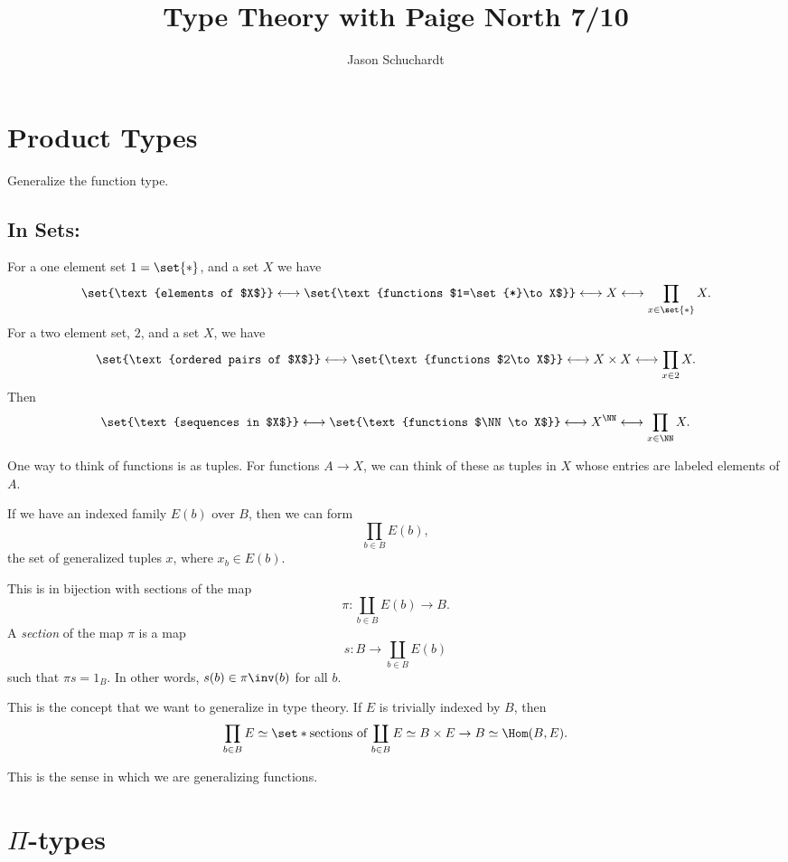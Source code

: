 \documentclass{article}
\title{Type Theory with Paige North 7/10}
\author{Jason Schuchardt}
\begin{document}
\maketitle

\section{Product Types}

Generalize the function type.

\subsection{In Sets:}

For a one element set $1=\set{*}$, and a set $X$
we have 
\[\set{\text{elements of $X$}}
\longleftrightarrow 
\set{\text{functions $1=\set{*}\to X$}}
\longleftrightarrow 
X
\longleftrightarrow
\prod_{x\in \set{*}} X.
\]
For a two element set, $2$, and a set $X$,
we have
\[\set{\text{ordered pairs of $X$}}
\longleftrightarrow 
\set{\text{functions $2\to X$}}
\longleftrightarrow 
X\times X
\longleftrightarrow
\prod_{x\in 2} X.
\]
Then 
\[\set{\text{sequences in $X$}}
\longleftrightarrow 
\set{\text{functions $\NN\to X$}}
\longleftrightarrow 
X^{\NN}
\longleftrightarrow
\prod_{x\in \NN} X.
\]

One way to think of functions is 
as tuples. For functions $A\to X$, we 
can think of these as tuples in $X$ whose entries are labeled 
elements of $A$.

If we have an indexed family $E(b)$ over $B$, then we can form
\[\prod_{b\in B} E(b), \]
the set of generalized tuples $x$, where $x_b \in E(b)$.

This is in bijection with sections of the map
\[\pi:\coprod_{b\in B} E(b) \to B.\]
A \emph{section} of the map $\pi$ is a map 
\[ s:B\to \coprod_{b\in B}E(b) \]
such that $\pi s = 1_B$. In other words, $s(b)\in \pi\inv(b)$
for all $b$.

This is the concept that we want to generalize in type theory.
If $E$ is trivially indexed by $B$, then 
\[ \prod_{b\in B} E
\simeq \set*{\text{sections of $\coprod_{b\in B}E\simeq B\times E \to B$}}
\simeq \Hom(B,E). \]

This is the sense in which we are generalizing functions.

\section{$\Pi$-types}
\end{document}

